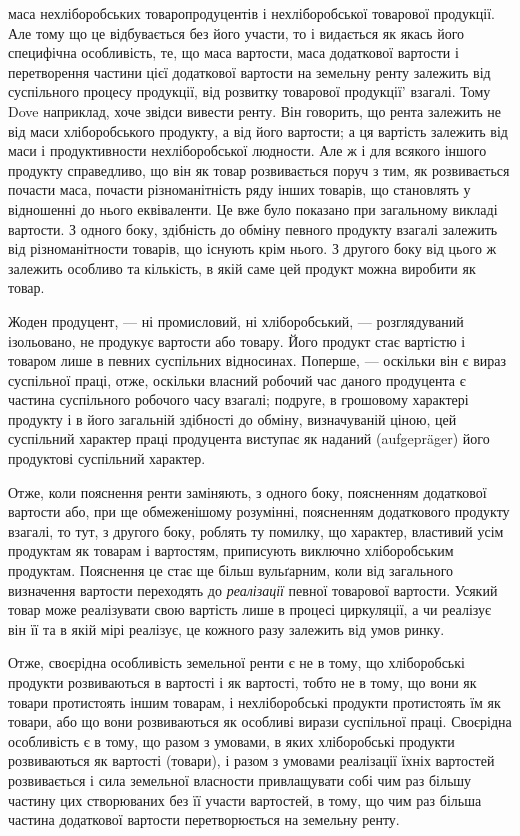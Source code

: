 \parcont{}  %
маса нехліборобських товаропродуцентів і нехліборобської товарової продукції.
Але тому що це відбувається без його участи, то і видається як якась його
специфічна особливість, те, що маса вартости, маса додаткової вартости і перетворення
частини цієї додаткової вартости на земельну ренту залежить від
суспільного процесу продукції, від розвитку товарової продукції' взагалі. Тому
Dove наприклад, хоче звідси вивести ренту. Він говорить, що рента залежить
не від маси хліборобського продукту, а від його вартости; а ця вартість залежить
від маси і продуктивности нехліборобської людности. Але ж і для всякого іншого
продукту справедливо, що він як товар розвивається поруч з тим, як розвивається
почасти маса, почасти різноманітність ряду інших товарів, що становлять у відношенні
до нього еквіваленти. Це вже було показано при загальному викладі
вартости. З одного боку, здібність до обміну певного продукту взагалі залежить
від різноманітности товарів, що існують крім нього. З другого боку від цього ж
залежить особливо та кількість, в якій саме цей продукт можна виробити як товар.

Жоден продуцент, — ні промисловий, ні хліборобський, — розглядуваний
ізольовано, не продукує вартости або товару. Його продукт стає вартістю і товаром
лише в певних суспільних відносинах. Поперше, — оскільки він є вираз суспільної
праці, отже, оскільки власний робочий час даного продуцента є частина суспільного
робочого часу взагалі; подруге, в грошовому характері продукту і в його загальній
здібності до обміну, визначуваній ціною, цей суспільний характер праці продуцента
виступає як наданий (aufgepräger) його продуктові суспільний характер.

Отже, коли пояснення ренти заміняють, з одного боку, поясненням додаткової
вартости або, при ще обмеженішому розумінні, поясненням додаткового
продукту взагалі, то тут, з другого боку, роблять ту помилку, що характер, властивий
усім продуктам як товарам і вартостям, приписують виключно хліборобським
продуктам. Пояснення це стає ще більш вульґарним, коли від загального визначення
вартости переходять до \emph{реалізації} певної товарової вартости. Усякий товар
може реалізувати свою вартість лише в процесі циркуляції, а чи реалізує
він її та в якій мірі реалізує, це кожного разу залежить від умов ринку.

Отже, своєрідна особливість земельної ренти є не в тому, що хліборобські
продукти розвиваються в вартості і як вартості, тобто не в тому, що вони як
товари протистоять іншим товарам, і нехліборобські продукти протистоять їм як
товари, або що вони розвиваються як особливі вирази суспільної праці. Своєрідна
особливість є в тому, що разом з умовами, в яких хліборобські продукти
розвиваються як вартості (товари), і разом з умовами реалізації їхніх вартостей
розвивається і сила земельної власности привлащувати собі чим раз більшу
частину цих створюваних без її участи вартостей, в тому, що чим раз більша
частина додаткової вартости перетворюється на земельну ренту.

